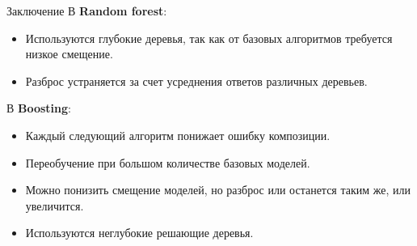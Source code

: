 \documentclass[notheorems, handout]{beamer}
\begin{document}
\begin{frame}{Заключение}
В \textbf{Random forest}:
\begin{itemize}
	\item Используются глубокие деревья, так как от базовых алгоритмов требуется низкое смещение.
	\item Разброс устраняется за счет усреднения ответов различных деревьев.
\end{itemize}
\par\smallskip
В \textbf{Boosting}:
\begin{itemize}
	\item Каждый следующий алгоритм понижает ошибку композиции.
	\item Переобучение при большом количестве базовых моделей.
	\item Можно понизить смещение моделей, но разброс или останется таким же, или увеличится.
	\item Используются неглубокие решающие деревья.
\end{itemize}
\end{frame}
\end{document}
